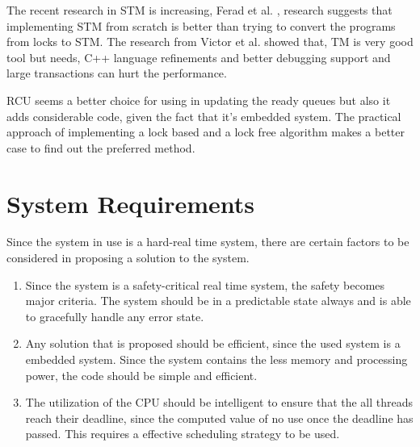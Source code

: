 The recent research in STM is increasing, Ferad et al. \cite{zyulkyarov2009atomic}, research suggests that implementing STM from scratch is better than trying to convert the programs from locks to STM. The research from Victor et al. \cite{pankratius2014software} showed that, TM is very good tool but needs, C++ language refinements and better debugging support and large transactions can hurt the performance.

RCU seems a better choice for using in updating the ready queues but also it adds considerable code, given the fact that it's embedded system. The practical approach of implementing a lock based and a lock free algorithm makes a better case to find out the preferred method.

\section{System Requirements} \label{foundations_cons}
Since the system in use is a hard-real time system, there are certain factors to be considered in proposing a solution to the system.

\begin{enumerate}

\item Since the system is a safety-critical real time system, the safety becomes major criteria. The system should be in a predictable state always and is able to gracefully handle any error state.

\item Any solution that is proposed should be efficient, since the used system is a embedded system. Since the system contains the less memory and processing power, the code should be simple and efficient.

\item The utilization of the CPU should be intelligent to ensure that the all threads reach their deadline, since the computed value of no use once the deadline has passed. This requires a effective scheduling strategy to be used. 

\end{enumerate}
